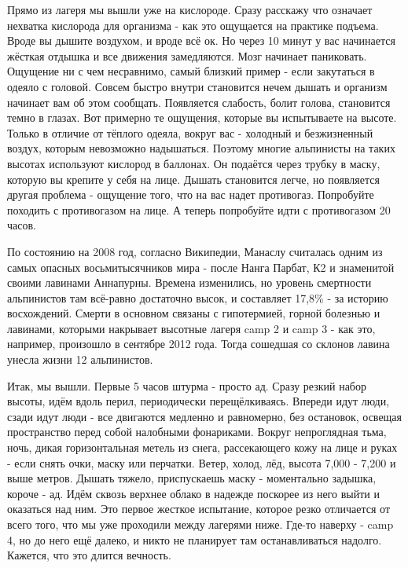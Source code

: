 
Прямо из лагеря мы вышли уже на кислороде. Сразу расскажу что означает нехватка
кислорода для организма - как это ощущается на практике подъема. Вроде вы
дышите воздухом, и вроде всё ок. Но через 10 минут у вас начинается жёсткая
отдышка и все движения замедляются. Мозг начинает паниковать. Ощущение ни с чем
несравнимо, самый близкий пример - если закутаться в одеяло с головой. Совсем
быстро внутри становится нечем дышать и организм начинает вам об этом сообщать.
Появляется слабость, болит голова, становится темно в глазах. Вот примерно те
ощущения, которые вы испытываете на высоте. Только в отличие от тёплого одеяла,
вокруг вас - холодный и безжизненный воздух, которым невозможно надышаться.
Поэтому многие альпинисты на таких высотах используют кислород в баллонах. Он
подаётся через трубку в маску, которую вы крепите у себя на лице. Дышать
становится легче, но появляется другая проблема - ощущение того, что на вас
надет противогаз. Попробуйте походить с противогазом на лице. А теперь
попробуйте идти с противогазом 20 часов. 


По состоянию на 2008 год, согласно Википедии, Манаслу считалась одним из самых
опасных восьмитысячников мира - после Нанга Парбат, К2 и знаменитой своими
лавинами Аннапурны. Времена изменились, но уровень смертности альпинистов там
всё-равно достаточно высок, и составляет 17,8\% - за историю восхождений. Смерти
в основном связаны с гипотермией, горной болезнью и лавинами, которыми
накрывает высотные лагеря camp 2 и camp 3 - как это, например, произошло в
сентябре 2012 года. Тогда сошедшая со склонов лавина унесла жизни 12
альпинистов. 


Итак, мы вышли. Первые 5 часов штурма - просто ад. Сразу резкий набор высоты,
идём вдоль перил, периодически перещёлкиваясь. Впереди идут люди, сзади идут
люди - все двигаются медленно и равномерно, без остановок, освещая пространство
перед собой налобными фонариками. Вокруг непроглядная тьма, ночь, дикая
горизонтальная метель из снега, рассекающего кожу на лице и руках - если снять
очки, маску или перчатки. Ветер, холод, лёд, высота 7,000 - 7,200 и выше
метров. Дышать тяжело, приспускаешь маску - моментально задышка, короче - ад.
Идём сквозь верхнее облако в надежде поскорее из него выйти и оказаться над
ним. Это первое жесткое испытание, которое резко отличается от всего того, что
мы уже проходили между лагерями ниже. Где-то наверху - camp 4, но до него ещё
далеко, и никто не планирует там останавливаться надолго. Кажется, что это
длится вечность. 

